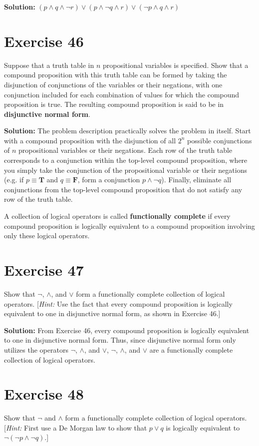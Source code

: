 \documentclass{Axon}
\begin{document}
\noindent
\textbf{Solution:}
\((p \land q \land \lnot r) \lor (p \land \lnot q \land r) \lor (\lnot p \land q \land r)\)

\section*{Exercise 46}
Suppose that a truth table in \(n\) propositional variables is specified. Show that a compound proposition with this truth table can be formed by taking the disjunction of conjunctions of the variables or their negations, with one conjunction included for each combination of values for which the compound proposition is true. The resulting compound proposition is said to be in \textbf{disjunctive normal form}.

\noindent
\textbf{Solution:}
The problem description practically solves the problem in itself. Start with a compound proposition with the disjunction of all \(2^n\) possible conjunctions of \(n\) propositional variables or their negations. Each row of the truth table corresponds to a conjunction within the top-level compound proposition, where you simply take the conjunction of the propositional variable or their negations (e.g. if \(p \equiv \textbf{T}\) and \(q \equiv \textbf{F}\), form a conjunction \(p \land \lnot q\)). Finally, eliminate all conjunctions from the top-level compound proposition that do not satisfy any row of the truth table.

A collection of logical operators is called \textbf{functionally complete} if every compound proposition is logically equivalent to a compound proposition involving only these logical operators.

\section*{Exercise 47}
Show that \(\lnot\), \(\land\), and \(\lor\) form a functionally complete collection of logical operators. [\textit{Hint:} Use the fact that every compound proposition is logically equivalent to one in disjunctive normal form, as shown in Exercise 46.]

\noindent
\textbf{Solution:}
From Exercise 46, every compound proposition is logically equivalent to one in disjunctive normal form. Thus, since disjunctive normal form only utilizes the operators \(\lnot\), \(\land\), and \(\lor\), \(\lnot\), \(\land\), and \(\lor\) are a functionally complete collection of logical operators.

\section*{Exercise 48}
Show that \(\lnot\) and \(\land\) form a functionally complete collection of logical operators. [\textit{Hint:} First use a De Morgan law to show that \(p \lor q\) is logically equivalent to \(\lnot(\lnot p \land \lnot q)\).]
\end{document}
